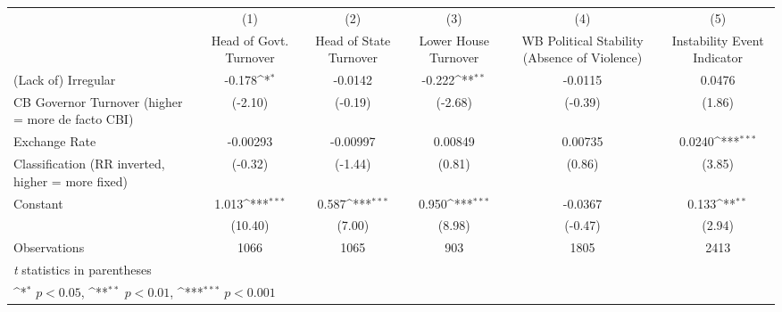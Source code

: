 {
\def\sym#1{\ifmmode^{#1}\else\(^{#1}\)\fi}
\begin{tabular}{l*{5}{c}}
\hline\hline
                    &\multicolumn{1}{c}{(1)}&\multicolumn{1}{c}{(2)}&\multicolumn{1}{c}{(3)}&\multicolumn{1}{c}{(4)}&\multicolumn{1}{c}{(5)}\\
                    &\multicolumn{1}{c}{Head of Govt. Turnover}&\multicolumn{1}{c}{Head of State Turnover}&\multicolumn{1}{c}{Lower House Turnover}&\multicolumn{1}{c}{WB Political Stability (Absence of Violence)}&\multicolumn{1}{c}{Instability Event Indicator}\\
\hline
(Lack of) Irregular &      -0.178\sym{*}  &     -0.0142         &      -0.222\sym{**} &     -0.0115         &      0.0476         \\
CB Governor Turnover (higher = more de facto CBI)&     (-2.10)         &     (-0.19)         &     (-2.68)         &     (-0.39)         &      (1.86)         \\
[1em]
Exchange Rate       &    -0.00293         &    -0.00997         &     0.00849         &     0.00735         &      0.0240\sym{***}\\
Classification (RR inverted, higher = more fixed)&     (-0.32)         &     (-1.44)         &      (0.81)         &      (0.86)         &      (3.85)         \\
[1em]
Constant            &       1.013\sym{***}&       0.587\sym{***}&       0.950\sym{***}&     -0.0367         &       0.133\sym{**} \\
                    &     (10.40)         &      (7.00)         &      (8.98)         &     (-0.47)         &      (2.94)         \\
\hline
Observations        &        1066         &        1065         &         903         &        1805         &        2413         \\
\hline\hline
\multicolumn{6}{l}{\footnotesize \textit{t} statistics in parentheses}\\
\multicolumn{6}{l}{\footnotesize \sym{*} \(p<0.05\), \sym{**} \(p<0.01\), \sym{***} \(p<0.001\)}\\
\end{tabular}
}
